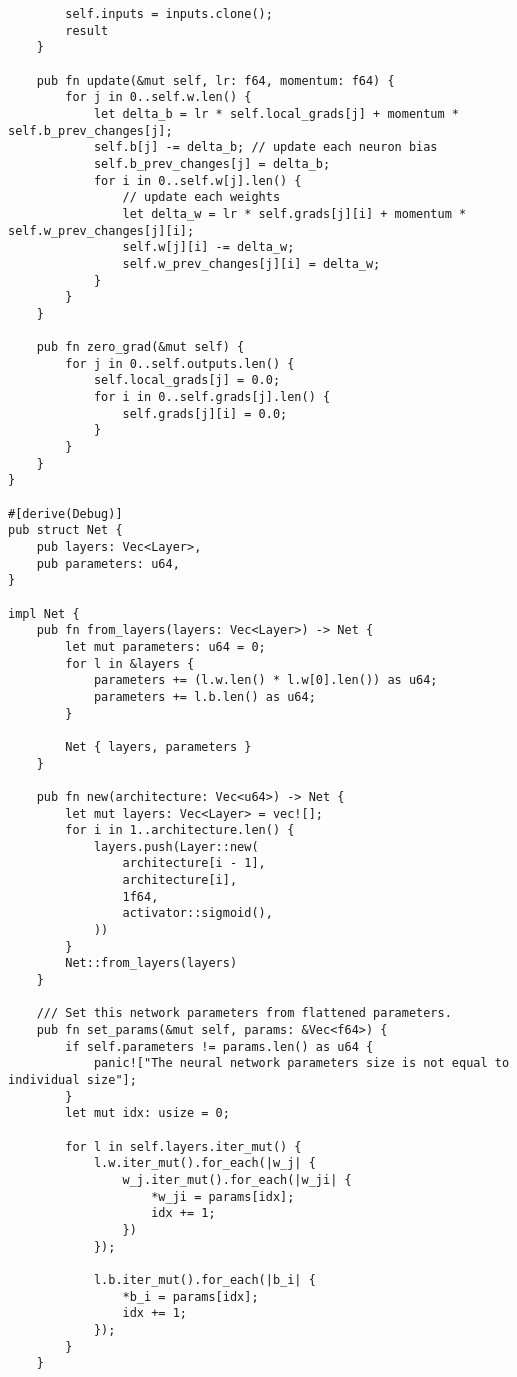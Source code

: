 \begin{code}
\begin{verbatim}
        self.inputs = inputs.clone();
        result
    }

    pub fn update(&mut self, lr: f64, momentum: f64) {
        for j in 0..self.w.len() {
            let delta_b = lr * self.local_grads[j] + momentum * self.b_prev_changes[j];
            self.b[j] -= delta_b; // update each neuron bias
            self.b_prev_changes[j] = delta_b;
            for i in 0..self.w[j].len() {
                // update each weights
                let delta_w = lr * self.grads[j][i] + momentum * self.w_prev_changes[j][i];
                self.w[j][i] -= delta_w;
                self.w_prev_changes[j][i] = delta_w;
            }
        }
    }

    pub fn zero_grad(&mut self) {
        for j in 0..self.outputs.len() {
            self.local_grads[j] = 0.0;
            for i in 0..self.grads[j].len() {
                self.grads[j][i] = 0.0;
            }
        }
    }
}

#[derive(Debug)]
pub struct Net {
    pub layers: Vec<Layer>,
    pub parameters: u64,
}

impl Net {
    pub fn from_layers(layers: Vec<Layer>) -> Net {
        let mut parameters: u64 = 0;
        for l in &layers {
            parameters += (l.w.len() * l.w[0].len()) as u64;
            parameters += l.b.len() as u64;
        }

        Net { layers, parameters }
    }

    pub fn new(architecture: Vec<u64>) -> Net {
        let mut layers: Vec<Layer> = vec![];
        for i in 1..architecture.len() {
            layers.push(Layer::new(
                architecture[i - 1],
                architecture[i],
                1f64,
                activator::sigmoid(),
            ))
        }
        Net::from_layers(layers)
    }

    /// Set this network parameters from flattened parameters.
    pub fn set_params(&mut self, params: &Vec<f64>) {
        if self.parameters != params.len() as u64 {
            panic!["The neural network parameters size is not equal to individual size"];
        }
        let mut idx: usize = 0;

        for l in self.layers.iter_mut() {
            l.w.iter_mut().for_each(|w_j| {
                w_j.iter_mut().for_each(|w_ji| {
                    *w_ji = params[idx];
                    idx += 1;
                })
            });

            l.b.iter_mut().for_each(|b_i| {
                *b_i = params[idx];
                idx += 1;
            });
        }
    }


\end{verbatim}
\end{code}
